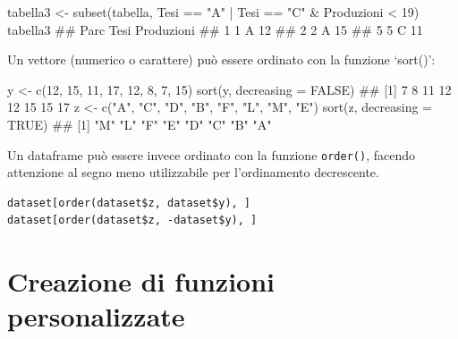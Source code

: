 \documentclass[a4paper,12pt,oneside]{book}
\newenvironment{Shaded}{\begin{snugshade}}{\end{snugshade}}
\newcommand{\DecValTok}[1]{#1}
\newcommand{\ConstantTok}[1]{#1}
\newcommand{\SpecialCharTok}[1]{#1}
\newcommand{\StringTok}[1]{#1}
\newcommand{\DocumentationTok}[1]{#1}
\newcommand{\OtherTok}[1]{#1}
\newcommand{\FunctionTok}[1]{#1}
\newcommand{\AttributeTok}[1]{#1}
\newcommand{\NormalTok}[1]{#1}
\begin{document}
\begin{Shaded}
\begin{Highlighting}[]
\NormalTok{tabella3  }\OtherTok{\textless{}{-}}  \FunctionTok{subset}\NormalTok{(tabella, Tesi }\SpecialCharTok{==} \StringTok{"A"} \SpecialCharTok{|}\NormalTok{ Tesi }\SpecialCharTok{==} \StringTok{"C"} \SpecialCharTok{\&} 
\NormalTok{                       Produzioni }\SpecialCharTok{\textless{}} \DecValTok{19}\NormalTok{)}
\NormalTok{tabella3}
\DocumentationTok{\#\#   Parc Tesi Produzioni}
\DocumentationTok{\#\# 1    1    A         12}
\DocumentationTok{\#\# 2    2    A         15}
\DocumentationTok{\#\# 5    5    C         11}
\end{Highlighting}
\end{Shaded}

Un vettore (numerico o carattere) può essere ordinato con la funzione `sort()':

\begin{Shaded}
\begin{Highlighting}[]
\NormalTok{y  }\OtherTok{\textless{}{-}}  \FunctionTok{c}\NormalTok{(}\DecValTok{12}\NormalTok{, }\DecValTok{15}\NormalTok{, }\DecValTok{11}\NormalTok{, }\DecValTok{17}\NormalTok{, }\DecValTok{12}\NormalTok{, }\DecValTok{8}\NormalTok{, }\DecValTok{7}\NormalTok{, }\DecValTok{15}\NormalTok{)}
\FunctionTok{sort}\NormalTok{(y, }\AttributeTok{decreasing =} \ConstantTok{FALSE}\NormalTok{)}
\DocumentationTok{\#\# [1]  7  8 11 12 12 15 15 17}
\NormalTok{z  }\OtherTok{\textless{}{-}}  \FunctionTok{c}\NormalTok{(}\StringTok{"A"}\NormalTok{, }\StringTok{"C"}\NormalTok{, }\StringTok{"D"}\NormalTok{, }\StringTok{"B"}\NormalTok{, }\StringTok{"F"}\NormalTok{, }\StringTok{"L"}\NormalTok{, }\StringTok{"M"}\NormalTok{, }\StringTok{"E"}\NormalTok{)}
\FunctionTok{sort}\NormalTok{(z, }\AttributeTok{decreasing =} \ConstantTok{TRUE}\NormalTok{)}
\DocumentationTok{\#\# [1] "M" "L" "F" "E" "D" "C" "B" "A"}
\end{Highlighting}
\end{Shaded}

Un dataframe può essere invece ordinato con la funzione \texttt{order()}, facendo attenzione al segno meno utilizzabile per l'ordinamento decrescente.

\begin{verbatim}
dataset[order(dataset$z, dataset$y), ]
dataset[order(dataset$z, -dataset$y), ]
\end{verbatim}

\hypertarget{creazione-di-funzioni-personalizzate}{%
\section{Creazione di funzioni personalizzate}\label{creazione-di-funzioni-personalizzate}}
\end{document}
